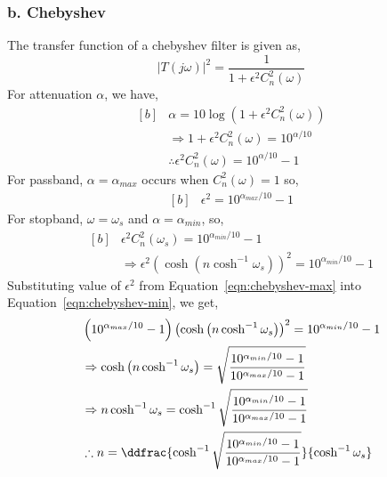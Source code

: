 \subsubsection*{b. Chebyshev}
The transfer function of a chebyshev filter is given as,
\begin{equation}
   |T(j\omega)|^2=\frac{1}{1+\epsilon^2C_n^2(\omega)}
\end{equation}
For attenuation $\alpha$, we have,
\begin{equation}
   \begin{aligned}[b]
     &\alpha=10\log{\left(1+\epsilon^2C_n^2(\omega)\right)}\\
     &\Rightarrow 1+\epsilon^2C_n^2(\omega)=10^{\alpha/10}\\
     &\therefore\epsilon^2C_n^2(\omega)=10^{\alpha/10}-1
   \end{aligned}
\end{equation}
For passband, $\alpha=\alpha_{max}$ occurs when $C_n^2(\omega)=1$ so,
\begin{equation}
  \begin{aligned}[b]
   &\epsilon^2=10^{\alpha_{max}/10}-1
  \end{aligned}
   \label{eqn:chebyshev-max}
\end{equation}
For stopband, $\omega=\omega_s$ and $\alpha=\alpha_{min}$, so,
\begin{equation}
   \begin{aligned}[b]
     & \epsilon^2 C_n^2(\omega_s)=10^{\alpha_{min}/10}-1\\
     &\Rightarrow \epsilon^2 \left(\cosh \left(n \cosh^{-1}\omega_s\right)\right)^2=10^{\alpha_{min}/10}-1
   \end{aligned}
   \label{eqn:chebyshev-min}
\end{equation}
Substituting value of $\epsilon^2$ from Equation~\ref{eqn:chebyshev-max} into Equation~\ref{eqn:chebyshev-min}, we get,
\begin{equation}
   \begin{aligned}[b]
      &\left(10^{\alpha_{max}/10}-1\right)\left(\cosh \left(n \cosh^{-1}\omega_s\right)\right)^2=10^{\alpha_{min}/10}-1\\
      &\Rightarrow \cosh \left(n \cosh^{-1}\omega_s\right)=\sqrt{\frac{10^{\alpha_{min}/10}-1}{10^{\alpha_{max}/10}-1}}\\
      &\Rightarrow n \cosh^{-1}\omega_s=\cosh^{-1}\sqrt{\frac{10^{\alpha_{min}/10}-1}{10^{\alpha_{max}/10}-1}}\\
      &\therefore n =\ddfrac{\cosh^{-1}\sqrt{\frac{10^{\alpha_{min}/10}-1}{10^{\alpha_{max}/10}-1}}}{\cosh^{-1}\omega_s}\\
   \end{aligned}
   \label{eqn:chebyshev-f1}
\end{equation}
